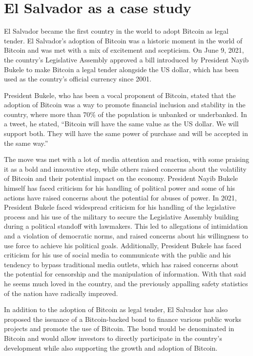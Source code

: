 \section{El Salvador as a case study}
El Salvador became the first country in the world to adopt Bitcoin as legal tender. El Salvador's adoption of Bitcoin was a historic moment in the world of Bitcoin and was met with a mix of excitement and scepticism. On June 9, 2021, the country's Legislative Assembly approved a bill introduced by President Nayib Bukele to make Bitcoin a legal tender alongside the US dollar, which has been used as the country's official currency since 2001.\par
President Bukele, who has been a vocal proponent of Bitcoin, stated that the adoption of Bitcoin was a way to promote financial inclusion and stability in the country, where more than 70\% of the population is unbanked or underbanked. In a tweet, he stated, ``Bitcoin will have the same value as the US dollar. We will support both. They will have the same power of purchase and will be accepted in the same way.''\par
The move was met with a lot of media attention and reaction, with some praising it as a bold and innovative step, while others raised concerns about the volatility of Bitcoin and their potential impact on the economy. President Nayib Bukele himself has faced criticism for his handling of political power and some of his actions have raised concerns about the potential for abuses of power. In 2021, President Bukele faced widespread criticism for his handling of the legislative process and his use of the military to secure the Legislative Assembly building during a political standoff with lawmakers. This led to allegations of intimidation and a violation of democratic norms, and raised concerns about his willingness to use force to achieve his political goals. Additionally, President Bukele has faced criticism for his use of social media to communicate with the public and his tendency to bypass traditional media outlets, which has raised concerns about the potential for censorship and the manipulation of information. With that said he seems much loved in the country, and the previously appalling safety statistics of the nation have radically improved.\par
In addition to the adoption of Bitcoin as legal tender, El Salvador has also proposed the issuance of a Bitcoin-backed bond to finance various public works projects and promote the use of Bitcoin. The bond would be denominated in Bitcoin and would allow investors to directly participate in the country's development while also supporting the growth and adoption of Bitcoin.\par
